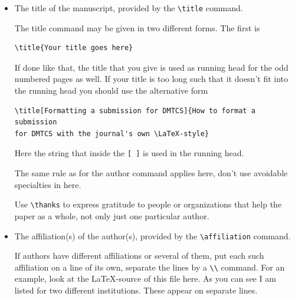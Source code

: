 \documentclass[
submission
]{dmtcs-episciences}
\begin{document}
\begin{itemize}
\item The title of the manuscript, provided by the \verb!\title!
  command.

  The title command may be given in two different forms. The first is 
\begin{verbatim}
\title{Your title goes here}
\end{verbatim}
  If done like that, the title that you give is used as running head
  for the odd numbered pages as well. If your title is too long such
  that it doesn't fit into the running head you should use the
  alternative form
\begin{verbatim}
\title[Formatting a submission for DMTCS]{How to format a submission 
for DMTCS with the journal's own \LaTeX-style}
\end{verbatim}
  Here the string that inside the \verb![ ]! is used in the
  running head.

  The same rule as for the author command applies here, don't use
  avoidable specialties in here.

  Use \verb!\thanks! to express gratitude to people or organizations
  that help the paper as a whole, not only just one particular
  author.
\item The affiliation(s) of the author(s), provided by the \verb!\affiliation!
  command.

  If authors have different affiliations or several of them, put each
  such affiliation on a line of its own, separate the lines by a
  \verb!\\!  command. For an example, look at the \LaTeX-source of
  this file here. As you can see I am listed for two different
  institutions. These appear on separate lines.


\end{itemize}
\end{document}
